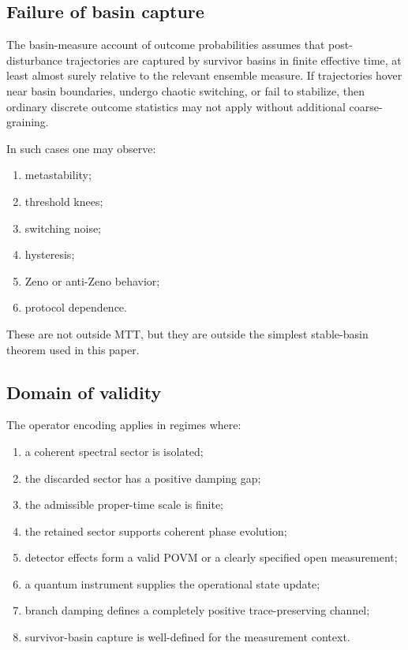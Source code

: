 \documentclass[11pt]{article}
\begin{document}
\subsection{Failure of basin capture}
\label{subsec:failure-basin-capture}

The basin-measure account of outcome probabilities assumes that post-disturbance trajectories
are captured by survivor basins in finite effective time, at least almost surely relative to the
relevant ensemble measure. If trajectories hover near basin boundaries, undergo chaotic
switching, or fail to stabilize, then ordinary discrete outcome statistics may not apply without
additional coarse-graining.

In such cases one may observe:
\begin{enumerate}[label=(\roman*)]
  \item metastability;
  \item threshold knees;
  \item switching noise;
  \item hysteresis;
  \item Zeno or anti-Zeno behavior;
  \item protocol dependence.
\end{enumerate}
These are not outside MTT, but they are outside the simplest stable-basin theorem used in
this paper.

\subsection{Domain of validity}
\label{subsec:domain-validity}

The operator encoding applies in regimes where:
\begin{enumerate}[label=(\roman*)]
  \item a coherent spectral sector is isolated;
  \item the discarded sector has a positive damping gap;
  \item the admissible proper-time scale is finite;
  \item the retained sector supports coherent phase evolution;
  \item detector effects form a valid POVM or a clearly specified open measurement;
  \item a quantum instrument supplies the operational state update;
  \item branch damping defines a completely positive trace-preserving channel;
  \item survivor-basin capture is well-defined for the measurement context.
\end{enumerate}
\end{document}
